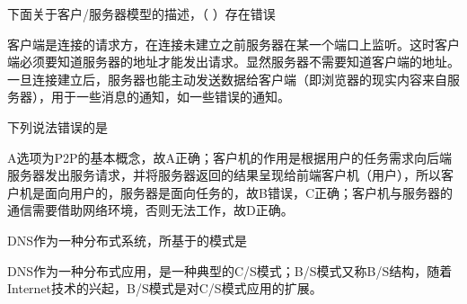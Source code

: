 \question 下面关于客户/服务器模型的描述，（ ）存在错误
\par{}
\begin{solution}客户端是连接的请求方，在连接未建立之前服务器在某一个端口上监听。这时客户端必须要知道服务器的地址才能发出请求。显然服务器不需要知道客户端的地址。一旦连接建立后，服务器也能主动发送数据给客户端（即浏览器的现实内容来自服务器），用于一些消息的通知，如一些错误的通知。
\end{solution}
\question 下列说法错误的是
\par{}
\begin{solution}A选项为P2P的基本概念，故A正确；客户机的作用是根据用户的任务需求向后端服务器发出服务请求，并将服务器返回的结果呈现给前端客户机（用户），所以客户机是面向用户的，服务器是面向任务的，故B错误，C正确；客户机与服务器的通信需要借助网络环境，否则无法工作，故D正确。
\end{solution}
\question DNS作为一种分布式系统，所基于的模式是
\par{}
\begin{solution}DNS作为一种分布式应用，是一种典型的C/S模式；B/S模式又称B/S结构，随着Internet技术的兴起，B/S模式是对C/S模式应用的扩展。
\end{solution}
